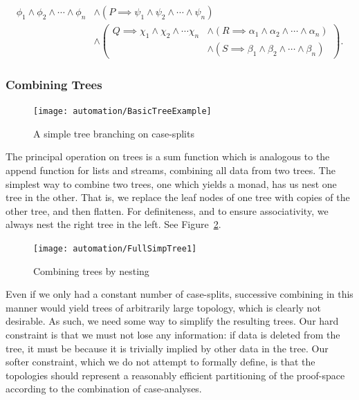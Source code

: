\begin{equation}\label{eq:CaseAnalysisTreeFormula}
\begin{aligned}
\phi_1 \wedge \phi_2 \wedge \cdots \wedge \phi_n &\wedge (P \implies \psi_1 \wedge \psi_2 \wedge \cdots \wedge \psi_n)\\
&\wedge \left(\begin{aligned} Q \implies \chi_1 \wedge \chi_2 \wedge \cdots \chi_n &\wedge (R \implies \alpha_1 \wedge \alpha_2 \wedge \cdots \wedge \alpha_n)\\ &\wedge (S \implies \beta_1 \wedge \beta_2 \wedge \cdots \wedge \beta_n)\end{aligned}\right).
\end{aligned}
\end{equation}

\subsubsection{Combining Trees}\label{fig:CombiningTrees}
\begin{figure}
\centering\texttt{[image: automation/BasicTreeExample]}
\caption{A simple tree branching on case-splits}
\label{fig:BasicTreeExample}
\end{figure}

The principal operation on trees is a sum function which is analogous to the append function for lists and streams, combining all data from two trees. The simplest way to combine two trees, one which yields a monad, has us nest one tree in the other. That is, we replace the leaf nodes of one tree with copies of the other tree, and then flatten. For definiteness, and to ensure associativity, we always nest the right tree in the left. See Figure~\ref{fig:TreeNesting}.

\begin{figure}
\centering\texttt{[image: automation/FullSimpTree1]}
\caption{Combining trees by nesting}
\label{fig:TreeNesting}
\end{figure}

Even if we only had a constant number of case-splits, successive combining in this manner would yield trees of arbitrarily large topology, which is clearly not desirable. As such, we need some way to simplify the resulting trees. Our hard constraint is that we must not lose any information: if data is deleted from the tree, it must be because it is trivially implied by other data in the tree. Our softer constraint, which we do not attempt to formally define, is that the topologies should represent a reasonably efficient partitioning of the proof-space according to the combination of case-analyses.

